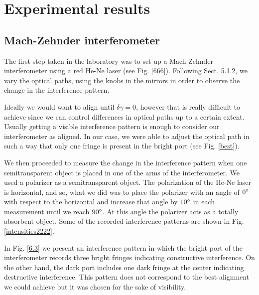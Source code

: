 \documentclass[12pt]{book}
\begin{document}
  
 \pagebreak
 

\chapter{Experimental results}

\section{Mach-Zehnder interferometer}

The first step taken in the laboratory was to set up a Mach-Zehnder interferometer using a red He-Ne laser (see Fig. \ref{666}). Following Sect. 5.1.2, we vary the optical paths, using the knobs in the mirrors in order to observe the change in the interference pattern.



Ideally we would want to align until $\delta \gamma=0$, however that is really difficult to achieve since we can control differences in optical paths up to a certain extent. Usually getting a visible interference pattern is enough to consider our interferometer as aligned. In our case, we were able to adjust the optical path in such a way that only one fringe is present in the bright port (see Fig. \ref{best}).

We then proceeded to measure the change in the interference pattern when one semitransparent object is placed in one of the arms of the interferometer. We used a polarizer as a semitransparent object. The polarization of the He-Ne laser is horizontal, and so, what we did was to place the polarizer with an angle of $0\degree$ with respect to the horizontal and increase that angle by $10\degree$ in each measurement until we reach $90\degree$. At this angle the polarizer acts as a totally absorbent object. Some of the recorded interference patterns are shown in Fig. \ref{intensities2222}. 

In Fig. \ref{6.3} we present an interference pattern in which the bright port of the interferometer records three bright fringes indicating constructive interference. On the other hand, the dark port includes one dark fringe at the center indicating destructive interference. This pattern does not correspond to the best alignment we could achieve but it was chosen for the sake of visibility.
\pagebreak
\end{document}
